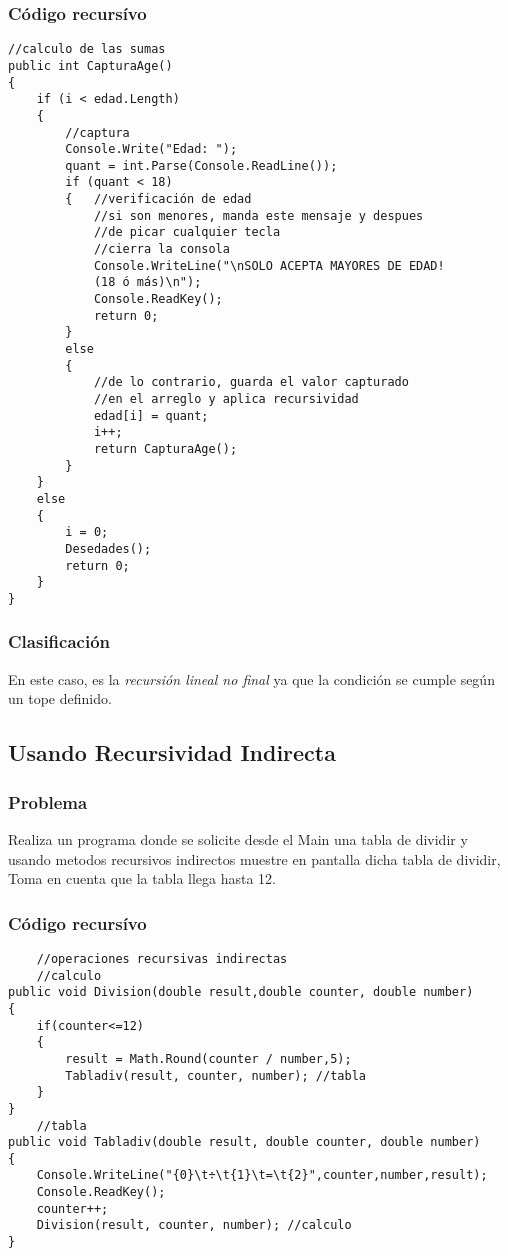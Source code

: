 \documentclass[letterpaper, 12pt]{article}
\begin{document}
\begin{justify}
            \subsubsection{Código recursívo}
\begin{verbatim}
//calculo de las sumas
public int CapturaAge()
{
    if (i < edad.Length)
    {
        //captura
        Console.Write("Edad: ");
        quant = int.Parse(Console.ReadLine());
        if (quant < 18)
        {   //verificación de edad
            //si son menores, manda este mensaje y despues 
            //de picar cualquier tecla
            //cierra la consola
            Console.WriteLine("\nSOLO ACEPTA MAYORES DE EDAD! 
            (18 ó más)\n");
            Console.ReadKey();
            return 0;
        }
        else
        {
            //de lo contrario, guarda el valor capturado 
            //en el arreglo y aplica recursividad
            edad[i] = quant;
            i++;
            return CapturaAge();
        }
    }
    else
    {
        i = 0;
        Desedades();
        return 0;
    }
}
\end{verbatim}
            \subsubsection{Clasificación}
            En este caso, es la \emph{recursión lineal no final} ya que la condición se cumple según un tope definido.
        \subsection{Usando Recursividad Indirecta}
            \subsubsection{Problema}
            Realiza un programa donde se solicite desde el Main una tabla de dividir  y usando metodos recursivos indirectos muestre en pantalla dicha tabla de dividir, 
            Toma en cuenta que la tabla llega hasta 12.
            \subsubsection{Código recursívo}
\begin{verbatim}
    //operaciones recursivas indirectas
    //calculo
public void Division(double result,double counter, double number)
{
    if(counter<=12)
    {
        result = Math.Round(counter / number,5);
        Tabladiv(result, counter, number); //tabla
    }
}
    //tabla
public void Tabladiv(double result, double counter, double number)
{
    Console.WriteLine("{0}\t÷\t{1}\t=\t{2}",counter,number,result);
    Console.ReadKey();
    counter++;
    Division(result, counter, number); //calculo
}
\end{verbatim}

\end{justify}
\end{document}
